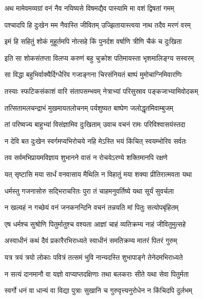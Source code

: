\twolineshloka
{अथ मामेवमव्यग्रां वनं नैव नयिष्यसे}
{विषमद्यैव पास्यामि मा वशं द्विषतां गमम्} %

\twolineshloka
{पश्चादपि हि दुःखेन मम नैवास्ति जीवितम्}
{उज्झितायास्त्वया नाथ तदैव मरणं वरम्} %

\twolineshloka
{इमं हि सहितुं शोकं मुहूर्तमपि नोत्सहे}
{किं पुनर्दश वर्षाणि त्रीणि चैकं च दुःखिता} %

\twolineshloka
{इति सा शोकसंतप्ता विलप्य करुणं बहु}
{चुक्रोश पतिमायस्ता भृशमालिङ्ग्य सस्वरम्} %

\twolineshloka
{सा विद्धा बहुभिर्वाक्यैर्दिग्धैरिव गजाङ्गना}
{चिरसंनियतं बाष्पं मुमोचाग्निमिवारणिः} %

\twolineshloka
{तस्याः स्फटिकसंकाशं वारि संतापसम्भवम्}
{नेत्राभ्यां परिसुस्राव पङ्कजाभ्यामिवोदकम्} %

\twolineshloka
{तत्सितामलचन्द्राभं मुखमायतलोचनम्}
{पर्यशुष्यत बाष्पेण जलोद्धृतमिवाम्बुजम्} %

\twolineshloka
{तां परिष्वज्य बाहुभ्यां विसंज्ञामिव दुःखिताम्}
{उवाच वचनं रामः परिविश्वासयंस्तदा} %

\twolineshloka
{न देवि बत दुःखेन स्वर्गमप्यभिरोचये}
{नहि मेऽस्ति भयं किंचित् स्वयम्भोरिव सर्वतः} %

\twolineshloka
{तव सर्वमभिप्रायमविज्ञाय शुभानने}
{वासं न रोचयेऽरण्ये शक्तिमानपि रक्षणे} %

\twolineshloka
{यत् सृष्टासि मया सार्धं वनवासाय मैथिलि}
{न विहातुं मया शक्या प्रीतिरात्मवता यथा} %

\twolineshloka
{धर्मस्तु गजनासोरु सद्भिराचरितः पुरा}
{तं चाहमनुवर्तिष्ये यथा सूर्यं सुवर्चला} %

\twolineshloka
{न खल्वहं न गच्छेयं वनं जनकनन्दिनि}
{वचनं तन्नयति मां पितुः सत्योपबृंहितम्} %

\twolineshloka
{एष धर्मश्च सुश्रोणि पितुर्मातुश्च वश्यता}
{आज्ञां चाहं व्यतिक्रम्य नाहं जीवितुमुत्सहे} %

\twolineshloka
{अस्वाधीनं कथं दैवं प्रकारैरभिराध्यते}
{स्वाधीनं समतिक्रम्य मातरं पितरं गुरुम्} %

\twolineshloka
{यत्र त्रयं त्रयो लोकाः पवित्रं तत्समं भुवि}
{नान्यदस्ति शुभापाङ्गे तेनेदमभिराध्यते} %

\twolineshloka
{न सत्यं दानमानौ वा यज्ञो वाप्याप्तदक्षिणाः}
{तथा बलकराः सीते यथा सेवा पितुर्मता} %

\twolineshloka
{स्वर्गो धनं वा धान्यं वा विद्या पुत्राः सुखानि च}
{गुरुवृत्त्यनुरोधेन न किंचिदपि दुर्लभम्} %

